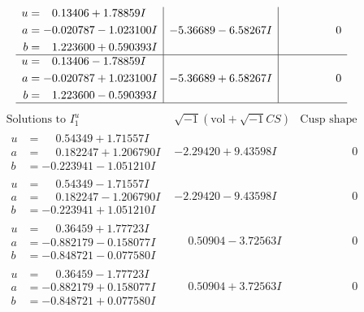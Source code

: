 \documentclass[1p]{elsarticle_modified}
\theoremstyle{definition}
\newcommand{\I}{\sqrt{-1}}
\begin{document}
$$\begin{array}{c|c|c}
\begin{aligned}
u &= \phantom{-}0.13406 + 1.78859 I \\
a &= -0.020787 - 1.023100 I \\
b &= \phantom{-}1.223600 + 0.590393 I\end{aligned}
 & -5.36689 - 6.58267 I & \phantom{-0.000000 } 0 \\ \hline\begin{aligned}
u &= \phantom{-}0.13406 - 1.78859 I \\
a &= -0.020787 + 1.023100 I \\
b &= \phantom{-}1.223600 - 0.590393 I\end{aligned}
 & -5.36689 + 6.58267 I & \phantom{-0.000000 } 0\\
 \hline 
 \end{array}$$\newpage$$\begin{array}{c|c|c}  
\text{Solutions to }I^u_{1}& \I (\text{vol} + \sqrt{-1}CS) & \text{Cusp shape}\\
 \hline 
\begin{aligned}
u &= \phantom{-}0.54349 + 1.71557 I \\
a &= \phantom{-}0.182247 + 1.206790 I \\
b &= -0.223941 - 1.051210 I\end{aligned}
 & -2.29420 + 9.43598 I & \phantom{-0.000000 } 0 \\ \hline\begin{aligned}
u &= \phantom{-}0.54349 - 1.71557 I \\
a &= \phantom{-}0.182247 - 1.206790 I \\
b &= -0.223941 + 1.051210 I\end{aligned}
 & -2.29420 - 9.43598 I & \phantom{-0.000000 } 0 \\ \hline\begin{aligned}
u &= \phantom{-}0.36459 + 1.77723 I \\
a &= -0.882179 - 0.158077 I \\
b &= -0.848721 - 0.077580 I\end{aligned}
 & \phantom{-}0.50904 - 3.72563 I & \phantom{-0.000000 } 0 \\ \hline\begin{aligned}
u &= \phantom{-}0.36459 - 1.77723 I \\
a &= -0.882179 + 0.158077 I \\
b &= -0.848721 + 0.077580 I\end{aligned}
 & \phantom{-}0.50904 + 3.72563 I & \phantom{-0.000000 } 0 \\ \hline\begin{aligned}

\end{aligned}
\end{array}$$
\end{document}
